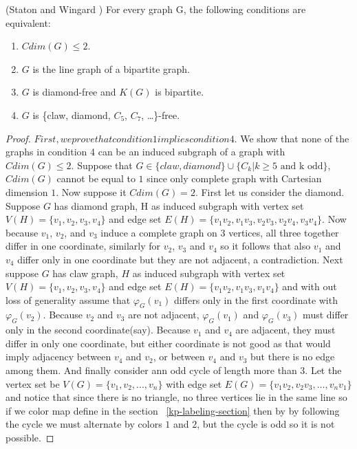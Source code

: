 \documentclass[12pt,a4paper,titlepage,openany]{report}
\begin{document}
\begin{theorem}(Staton and Wingard \cite{Staton})
For every graph G, the following conditions are equivalent:
\begin{enumerate}
\item $Cdim(G)\leq 2$.
\item $G$ is the line graph of a bipartite graph.
\item $G$ is diamond-free and $K(G)$ is bipartite.
\item $G$ is \{claw, diamond, $C_5$, $C_7$, \ldots\}-free.
\end{enumerate}
\end{theorem}

\begin{proof}
$First, we prove that condition 1 implies condition 4$. We show that none of the graphs in condition 4 can be an induced subgraph of a graph with $Cdim(G)\leq 2$. Suppose that $G\in \{ claw, diamond\} \cup \{C_k|k\geq 5 \text{ and k odd}\}$, $Cdim(G)$ cannot be equal to $1$ since only complete graph with Cartesian dimension $1$. Now suppose it $Cdim(G)=2$.
\newline First let us consider the diamond. Suppose $G$ has diamond graph, H as induced subgraph with vertex set $V(H)=\{v_1,v_2,v_3,v_4\}$ and edge set $E(H)=\{v_1v_2,v_1v_3,v_2v_3,v_2v_4,v_3v_4\}$. Now because $v_1$, $v_2$, and $v_3$ induce a complete graph on $3$ vertices, all three together differ in one coordinate, similarly for $v_2$, $v_3$ and $v_4$ so it follows that also $v_1$ and $v_4$ differ only in one coordinate but they are not adjacent, a contradiction.
\newline Next suppose $G$ has claw graph, $H$ as induced subgraph with vertex set $V(H)=\{v_1,v_2,v_3,v_4\}$ and edge set $E(H)=\{v_1v_2,v_1v_3,v_1v_4\}$ and with out loss of generality assume that $\varphi_G(v_1)$ differs only in the first coordinate with $\varphi_G(v_2)$. Because $v_2$ and $v_3$ are not adjacent, $\varphi_G(v_1)$ and $\varphi_G(v_3)$ must differ only in the second coordinate(say). Because $v_1$ and $v_4$ are adjacent, they must differ in only one coordinate, but either coordinate is not good as that would  imply adjacency between $v_4$ and $v_2$, or between $v_4$ and $v_3$ but there is no edge among them.
\newline And finally consider ann odd cycle of length more than 3. Let the vertex set be $V(G)=\{v_1,v_2,...,v_n\}$ with edge set $E(G)=\{v_1v_2,v_2v_3,\ldots ,v_nv_1\}$ and notice that since there is no triangle, no three vertices lie in the same line so if we color map define in the section ~\ref{kp-labeling-section} then by by following the cycle we must alternate by colors $1$ and $2$, but the cycle is odd so it is not possible.\newline

\end{proof}
\end{document}
